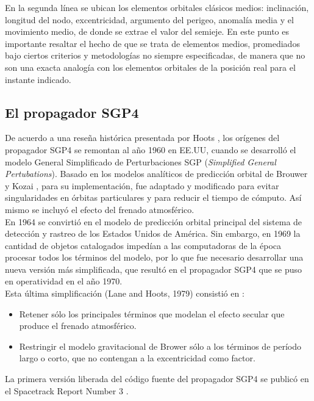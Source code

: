 {En la segunda l\'inea se ubican los elementos orbitales cl\'asicos medios: inclinaci\'on, longitud del nodo, excentricidad, argumento del perigeo, anomal\'ia media y el movimiento medio, de donde se extrae el valor del semieje. En este punto es importante resaltar el hecho de que se trata de elementos medios, promediados bajo ciertos criterios y metodologías no siempre especificadas, de manera que no son una exacta analog\'ia con los elementos orbitales de la posici\'on real para el instante indicado.

\subsection{El propagador SGP4}\label{subsec:sgp4model}
De acuerdo a una rese\~na hist\'orica presentada por Hoots \citep{hootshistoria}, los or\'igenes del propagador SGP4 se remontan al a\~no 1960 en EE.UU, cuando se desarroll\'o el modelo General Simplificado de Perturbaciones SGP  ({\it{Simplified General Pertubations}}). Basado en los modelos anal\'iticos de predicci\'on orbital de Brouwer \citep{brouwer1959solution} y Kozai \citep{kozai1962second}, para su implementaci\'on, fue adaptado y modificado para evitar singularidades en \'orbitas particulares y para reducir el tiempo de c\'omputo. As\'i mismo se incluy\'o el efecto del frenado atmosf\'erico.\\

En 1964 se convirti\'o en el modelo de predicci\'on orbital principal del sistema de detecci\'on y rastreo de los Estados Unidos de Am\'erica.
Sin embargo, en 1969 la cantidad de objetos catalogados imped\'ian a las computadoras de la \'epoca procesar todos los t\'erminos del modelo, por lo que fue necesario desarrollar una nueva versi\'on m\'as simplificada, que result\'o en el propagador SGP4 que se puso en operatividad en el a\~no 1970.\\

Esta \'ultima simplificaci\'on (Lane and Hoots, 1979) consisti\'o en :\\
\begin{itemize}
 \item Retener s\'olo los principales t\'erminos que modelan el efecto secular que produce el frenado atmosf\'erico.
 \item Restringir el modelo gravitacional de Brower s\'olo a los t\'erminos de per\'iodo largo o corto, que no contengan a la excentricidad como factor.
\end{itemize}

La primera versi\'on liberada del c\'odigo fuente del propagador SGP4 se public\'o en el Spacetrack Report Number 3 \citep{spacetrackreport3}.\\

}
